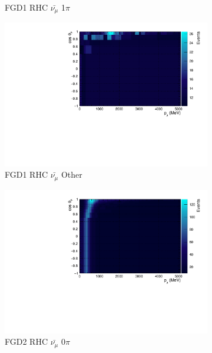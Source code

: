 \begin{figure}
\begin{subfigure}{.32\textwidth}
  \caption{FGD1 RHC $\bar{\nu_{\mu}}$ 1$\pi$}
  \label{fig:th2polyth2polyFGD1_anti-numuCC_1pi}
\end{subfigure}
\begin{subfigure}{.32\textwidth}
  \centering
  \includegraphics[width=0.95\linewidth]{figs/TH2Poly_MC_FGD1_anti-numuCC_other}
  \caption{FGD1 RHC $\bar{\nu_{\mu}}$ Other}
  \label{fig:th2polyFGD1_anti-numuCC_other}
\end{subfigure}
\centering
\begin{subfigure}{.32\textwidth}
  \centering
  \includegraphics[width=0.95\linewidth]{figs/TH2Poly_MC_FGD2_anti-numuCC_0pi}
  \caption{FGD2 RHC $\bar{\nu_{\mu}}$ 0$\pi$}
  \label{fig:th2polyFGD2_anti-numuCC_0pi}
\end{subfigure}
\begin{subfigure}{.32\textwidth}
  \centering

\end{subfigure}
\end{figure}
